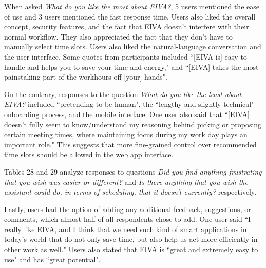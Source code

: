 \documentclass{article}
\begin{document}
When asked \emph{What do you like the most about EIVA?}, 5 users mentioned the ease of use and 3 users mentioned the fast response time. Users also liked the overall concept, security features, and the fact that EIVA doesn't interfere with their normal workflow. They also appreciated the fact that they don't have to manually select time slots. Users also liked the natural-language conversation and the user interface. Some quotes from participants included ``[EIVA is] easy to handle and helps you to save your time and energy," and ``[EIVA] takes the most painstaking part of the workhours off [your] hands".

On the contrary, responses to the question \emph{What do you like the least about EIVA?} included ``pretending to be human", the ``lengthy and slightly technical" onboarding process, and the mobile interface. One user also said that ``[EIVA] doesn't fully seem to know/understand my reasoning behind picking or proposing certain meeting times, where maintaining focus during my work day plays an important role." This suggests that more fine-grained control over recommended time slots should be allowed in the web app interface.

Tables 28 and 29 analyze responses to questions \emph{Did you find anything frustrating that you wish was easier or different?} and \emph{Is there anything that you wish the assistant could do, in terms of scheduling, that it doesn't currently?} respectively.

Lastly, users had the option of adding any additional feedback, suggestions, or comments, which almost half of all respondents chose to add. One user said ``I really like EIVA, and I think that we need such kind of smart applications in today's world that do not only save time, but also help us act more efficiently in other work as well." Users also stated that EIVA is ``great and extremely easy to use" and has ``great potential".
\end{document}
